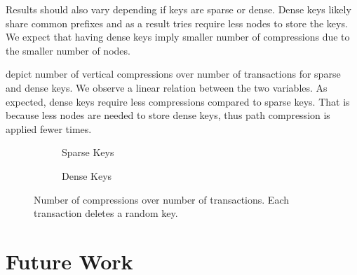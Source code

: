 \documentclass[abstracton,12pt]{scrartcl}
\theoremstyle{definition}
\begin{document}
Results should also vary depending if keys are sparse or dense. Dense keys
likely share common prefixes and as a result tries require less nodes to 
store the keys. We expect that having dense keys imply smaller number
of compressions due to the smaller number of nodes.

 depict number of vertical
compressions over number of transactions for sparse and dense keys. 
We observe a linear relation between the two variables. As expected, 
dense keys require less compressions compared to sparse keys. That is because 
less nodes are needed to store dense keys, thus path compression is applied
fewer times.

\begin{figure}[H]
  \centering
  \begin{subfigure}[b]{0.49\textwidth}
    \caption{Sparse Keys}
    \label{fig:compressions-sparse}
  \end{subfigure}
  \begin{subfigure}[b]{0.49\textwidth}
    \caption{Dense Keys}
    \label{fig:compressions-dense}
  \end{subfigure}
  \caption{Number of compressions over number of transactions. Each transaction
  deletes a random key.}
\end{figure}

\vspace{-5mm}
\section{Future Work}
\label{sec:future-work}
\end{document}
